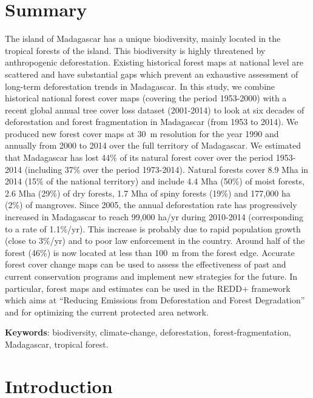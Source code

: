 \documentclass[]{article}
\theoremstyle{definition}
\theoremstyle{definition}
\theoremstyle{definition}
\theoremstyle{remark}
\begin{document}
\hypertarget{summary}{%
\section{Summary}\label{summary}}

The island of Madagascar has a unique biodiversity, mainly located in
the tropical forests of the island. This biodiversity is highly
threatened by anthropogenic deforestation. Existing historical forest
maps at national level are scattered and have substantial gaps which
prevent an exhaustive assessment of long-term deforestation trends in
Madagascar. In this study, we combine historical national forest cover
maps (covering the period 1953-2000) with a recent global annual tree
cover loss dataset (2001-2014) to look at six decades of deforestation
and forest fragmentation in Madagascar (from 1953 to 2014). We produced
new forest cover maps at 30~m resolution for the year 1990 and annually
from 2000 to 2014 over the full territory of Madagascar. We estimated
that Madagascar has lost 44\% of its natural forest cover over the
period 1953-2014 (including 37\% over the period 1973-2014). Natural
forests cover 8.9 Mha in 2014 (15\% of the national territory) and
include 4.4 Mha (50\%) of moist forests, 2.6 Mha (29\%) of dry forests,
1.7 Mha of spiny forests (19\%) and 177,000 ha (2\%) of mangroves. Since
2005, the annual deforestation rate has progressively increased in
Madagascar to reach 99,000 ha/yr during 2010-2014 (corresponding to a
rate of 1.1\%/yr). This increase is probably due to rapid population
growth (close to 3\%/yr) and to poor law enforcement in the country.
Around half of the forest (46\%) is now located at less than 100~m from
the forest edge. Accurate forest cover change maps can be used to assess
the effectiveness of past and current conservation programs and
implement new strategies for the future. In particular, forest maps and
estimates can be used in the REDD+ framework which aims at ``Reducing
Emissions from Deforestation and Forest Degradation'' and for optimizing
the current protected area network.

\textbf{Keywords}: biodiversity, climate-change, deforestation,
forest-fragmentation, Madagascar, tropical forest.

\hypertarget{introduction}{%
\section{Introduction}\label{introduction}}
\end{document}
